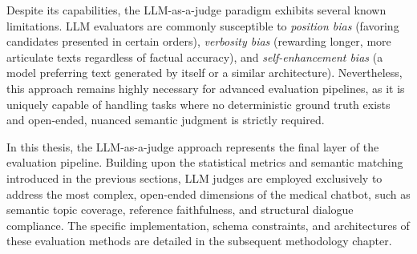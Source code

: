 Despite its capabilities, the LLM-as-a-judge paradigm exhibits several known limitations. 
LLM evaluators are commonly susceptible to \textit{position bias} (favoring candidates presented in certain orders), \textit{verbosity bias} (rewarding longer, more articulate texts regardless of factual accuracy), and \textit{self-enhancement bias} (a model preferring text generated by itself or a similar architecture). 
Nevertheless, this approach remains highly necessary for advanced evaluation pipelines, as it is uniquely capable of handling tasks where no deterministic ground truth exists and open-ended, nuanced semantic judgment is strictly required.

In this thesis, the LLM-as-a-judge approach represents the final layer of the evaluation pipeline. Building upon the statistical metrics and semantic matching introduced in the previous sections, LLM judges are employed exclusively to address the most complex, open-ended dimensions of the medical chatbot, such as semantic topic coverage, reference faithfulness, and structural dialogue compliance. The specific implementation, schema constraints, and architectures of these evaluation methods are detailed in the subsequent methodology chapter.


